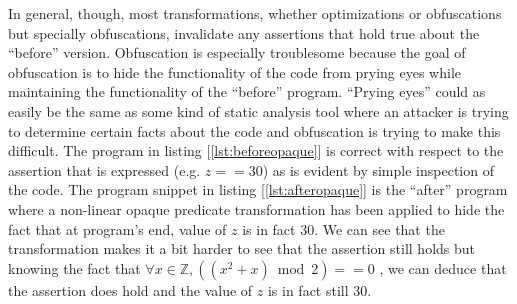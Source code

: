 \documentclass[compsoc,conference,a4paper,10pt,times]{IEEEtran}
\begin{document}
In general, though, most transformations, whether optimizations or obfuscations but specially obfuscations, invalidate any assertions that hold true about the ``before'' version. Obfuscation is especially troublesome because the goal of obfuscation is to hide the functionality of the code from prying eyes while maintaining the functionality of the ``before'' program. ``Prying eyes'' could as easily be the same as some kind of static analysis tool where an attacker is trying to determine certain facts about the code and obfuscation is trying to make this difficult. The program in listing [\ref{lst:beforeopaque}] is correct with respect to the assertion that is expressed (e.g. $z == 30$) as is evident by simple inspection of the code. The program snippet in listing [\ref{lst:afteropaque}] is the ``after'' program where a non-linear opaque predicate transformation has been applied to hide the fact that at program's end, value of $z$ is in fact 30. We can see that the transformation makes it a bit harder to see that the assertion still holds but knowing the fact that $\forall x \in \mathbb{Z}, ((x^2 + x)\bmod 2) == 0$ , we can deduce that the assertion does hold and the value of $z$ is in fact still 30. 


\end{document}
